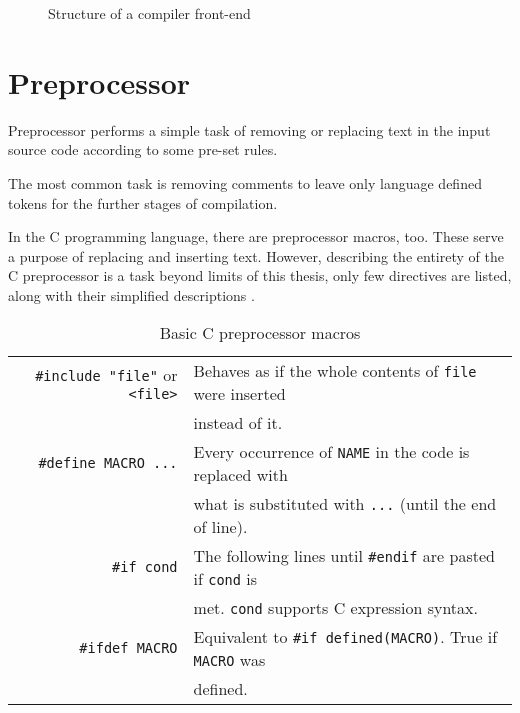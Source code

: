     \begin{figure}[H]
    \centering
    \caption{Structure of a compiler front-end} \label{fig:compiler}
    \end{figure}

    \section{Preprocessor}

    Preprocessor performs a simple task of removing or replacing text in the input source code according to some pre-set rules.

    The most common task is removing comments to leave only language defined tokens for the further stages of compilation.

    In the C programming language, there are preprocessor macros, too. These serve a purpose of replacing and inserting text. However, describing the entirety of the C preprocessor is a task beyond limits of this thesis, only few directives are listed, along with their simplified descriptions \cite{GnuCppWeb}.

    \begin{table}[H]
    \begin{tabular}{r|l}
        \verb|#include "file"| or \verb|<file>| & Behaves as if the whole contents of \verb|file| were inserted \\
        & instead of it.\\
        \verb|#define MACRO ...| & Every occurrence of \verb|NAME| in the code is replaced with \\
        & what is substituted with \verb|...| (until the end of line).\\
        \verb|#if cond| & The following lines until \verb|#endif| are pasted if \verb|cond| is\\
        & met. \verb|cond| supports C expression syntax.\\
        \verb|#ifdef MACRO| & Equivalent to \verb|#if defined(MACRO)|. True if \verb|MACRO| was\\
        & defined.
    \end{tabular}
    \caption{Basic C preprocessor macros}
    \end{table}

